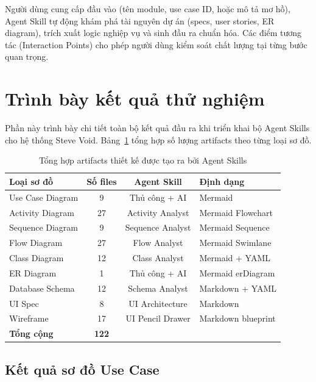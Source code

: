 \documentclass[13pt,a4paper,oneside]{extreport}
\numberwithin{equation}{chapter}
\numberwithin{figure}{chapter}
\numberwithin{table}{chapter}
\begin{document}
Người dùng cung cấp đầu vào (tên module, use case ID, hoặc mô tả mơ hồ), Agent Skill tự động khám phá tài nguyên dự án (specs, user stories, ER diagram), trích xuất logic nghiệp vụ và sinh đầu ra chuẩn hóa. Các điểm tương tác (Interaction Points) cho phép người dùng kiểm soát chất lượng tại từng bước quan trọng.

\section{Trình bày kết quả thử nghiệm}

Phần này trình bày chi tiết toàn bộ kết quả đầu ra khi triển khai bộ Agent Skills cho hệ thống Steve Void. Bảng~\ref{tab:artifact-summary} tổng hợp số lượng artifacts theo từng loại sơ đồ.

\begin{table}[H]
\centering
\caption{Tổng hợp artifacts thiết kế được tạo ra bởi Agent Skills}
\label{tab:artifact-summary}
\begin{tabular}{|p{4.5cm}|c|c|p{4cm}|}
\hline
\textbf{Loại sơ đồ} & \textbf{Số files} & \textbf{Agent Skill} & \textbf{Định dạng} \\
\hline
Use Case Diagram & 9 & Thủ công + AI & Mermaid \\
\hline
Activity Diagram & 27 & Activity Analyst & Mermaid Flowchart \\
\hline
Sequence Diagram & 9 & Sequence Analyst & Mermaid Sequence \\
\hline
Flow Diagram & 27 & Flow Analyst & Mermaid Swimlane \\
\hline
Class Diagram & 12 & Class Analyst & Mermaid + YAML \\
\hline
ER Diagram & 1 & Thủ công + AI & Mermaid erDiagram \\
\hline
Database Schema & 12 & Schema Analyst & Markdown + YAML \\
\hline
UI Spec & 8 & UI Architecture & Markdown \\
\hline
Wireframe & 17 & UI Pencil Drawer & Markdown blueprint \\
\hline
\textbf{Tổng cộng} & \textbf{122} & & \\
\hline
\end{tabular}
\end{table}

\subsection{Kết quả sơ đồ Use Case}
\end{document}
